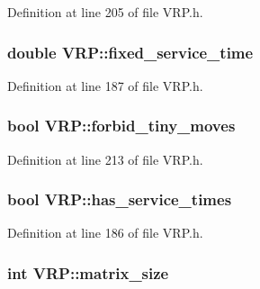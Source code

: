 Definition at line 205 of file VRP.h.

\hypertarget{class_v_r_p_a31a699aee99ab5ceb4ef1a8ac517937f}{
\subsubsection[{fixed\_\-service\_\-time}]{\setlength{\rightskip}{0pt plus 5cm}double {\bf VRP::fixed\_\-service\_\-time}}}
\label{class_v_r_p_a31a699aee99ab5ceb4ef1a8ac517937f}


Definition at line 187 of file VRP.h.

\hypertarget{class_v_r_p_a7de6d41fe877d981e8a5bf5b25a39cab}{
\subsubsection[{forbid\_\-tiny\_\-moves}]{\setlength{\rightskip}{0pt plus 5cm}bool {\bf VRP::forbid\_\-tiny\_\-moves}}}
\label{class_v_r_p_a7de6d41fe877d981e8a5bf5b25a39cab}


Definition at line 213 of file VRP.h.

\hypertarget{class_v_r_p_aba36cee3f7c8bdc5f97ccf8b35c2e6d5}{
\subsubsection[{has\_\-service\_\-times}]{\setlength{\rightskip}{0pt plus 5cm}bool {\bf VRP::has\_\-service\_\-times}}}
\label{class_v_r_p_aba36cee3f7c8bdc5f97ccf8b35c2e6d5}


Definition at line 186 of file VRP.h.

\hypertarget{class_v_r_p_aa84ae03f2bd1c91491f270a672f8fcd1}{
\subsubsection[{matrix\_\-size}]{\setlength{\rightskip}{0pt plus 5cm}int {\bf VRP::matrix\_\-size}}}
\label{class_v_r_p_aa84ae03f2bd1c91491f270a672f8fcd1}


